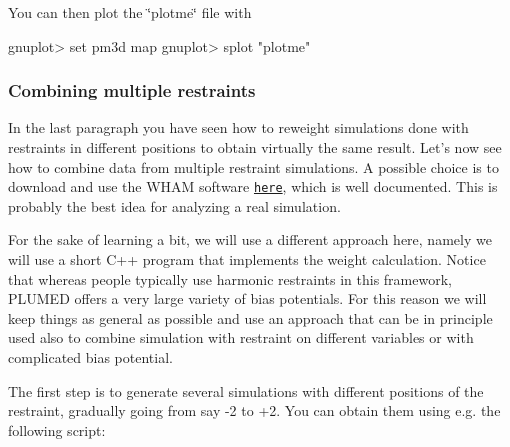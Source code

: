 

You can then plot the \char`\"{}plotme\char`\"{} file with \begin{DoxyVerb}gnuplot> set pm3d map
gnuplot> splot "plotme"
\end{DoxyVerb}
\hypertarget{belfast-4_belfast-4-wham}{}\subsubsection{Combining multiple restraints}\label{belfast-4_belfast-4-wham}
In the last paragraph you have seen how to reweight simulations done with restraints in different positions to obtain virtually the same result. Let's now see how to combine data from multiple restraint simulations. A possible choice is to download and use the W\+H\+A\+M software \href{http://membrane.urmc.rochester.edu/content/wham}{\tt here}, which is well documented. This is probably the best idea for analyzing a real simulation.

For the sake of learning a bit, we will use a different approach here, namely we will use a short C++ program that implements the weight calculation. Notice that whereas people typically use harmonic restraints in this framework, P\+L\+U\+M\+E\+D offers a very large variety of bias potentials. For this reason we will keep things as general as possible and use an approach that can be in principle used also to combine simulation with restraint on different variables or with complicated bias potential.

The first step is to generate several simulations with different positions of the restraint, gradually going from say -\/2 to +2. You can obtain them using e.\+g. the following script\+: 


